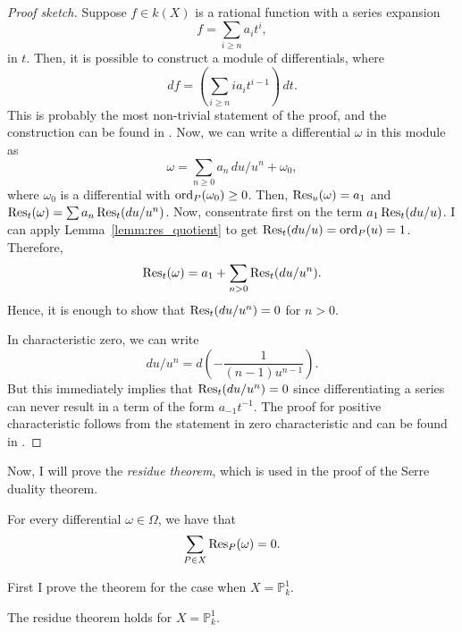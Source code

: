 \begin{proof}[Proof sketch]
  Suppose $f\in k(X)$ is a rational function with a series expansion
  \[
    f=\sum_{i\geq n}a_{i}t^{i},
  \]
  in $t$. Then, it is possible to construct a module of differentials, where
  \[
    df=\left(\sum_{i\geq n}ia_{i}t^{i-1}\right)\,dt.
  \]
  This is probably the most non-trivial statement of the proof, and the
  construction can be found in \cite{serre}. Now, we can write a
  differential $\omega$ in this module as
  \[
    \omega = \sum_{n\geq 0}a_{n}\,du/u^{n}+\omega_{0},
  \]
  where $\omega_{0}$ is a differential with $\operatorname{ord}_{P}(\omega_{0})\geq 0$.
  Then, $\operatorname{Res}_{u}(\omega)=a_{1}$ and $\operatorname{Res}_{t}(\omega)=
  \sum a_{n}\operatorname{Res}_{t}(du/u^{n})$. Now, consentrate first on the term
  $a_{1}\operatorname{Res}_{t}(du/u)$. I can apply Lemma~\ref{lemm:res_quotient}
  to get $\operatorname{Res}_{t}(du/u)=\operatorname{ord}_{P}(u)=1$. Therefore,
  \[
    \operatorname{Res}_{t}(\omega) = a_{1}+\sum_{n>0}\operatorname{Res}_{t}(du/u^{n}).
  \]
  Hence, it is enough to show that $\operatorname{Res}_{t}(du/u^{n})=0$ for $n>0$.

  In characteristic zero, we can write
  \[
    du/u^{n}=d\left(-\frac1{(n-1)u^{n-1}}\right).
  \]
  But this immediately implies that $\operatorname{Res}_{t}(du/u^{n})=0$ since
  differentiating a series can never result in a term of the form
  $a_{-1}t^{-1}$. The proof for positive characteristic follows from the
  statement in zero characteristic and can be found in \cite{serre}.
\end{proof}
Now, I will prove the \emph{residue theorem}, which is used in the proof
of the Serre duality theorem.
\begin{thm}\label{thm:residue_theorem}
  For every differential $\omega\in\Omega$, we have that
  \[
    \sum_{P\in X}\operatorname{Res}_{P}(\omega)=0.
  \]
\end{thm}
First I prove the theorem for the case when $X=\mathbb{P}^{1}_{k}$.
\begin{lemm}
  The residue theorem holds for $X=\mathbb{P}^{1}_{k}$.
\end{lemm}
